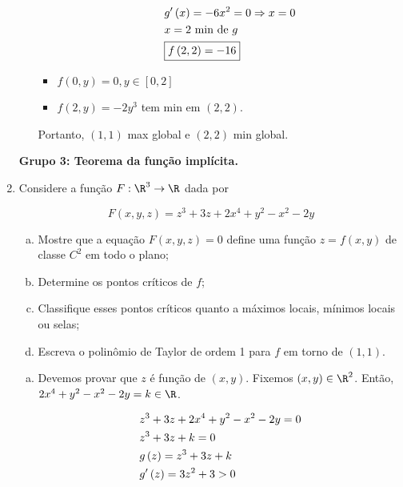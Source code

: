 \documentclass[11pt, oneside, a4paper]{gsm-l}
\begin{document}
\begin{enumerate}
\begin{sol}
\begin{enumerate}[(a)]
\begin{itemize}
\[
\begin{gathered}
  g'\left( x \right) =  - 6x^2  = 0 \Rightarrow x = 0 \hfill \\
  x = 2{\text{ min de }}g \hfill \\
  \boxed{f\left( {2,2} \right) =  - 16} \hfill \\
\end{gathered}
\]

      \item $f(0,y)=0,y \in \left[ {0,2} \right]$
      \item $f(2,y)=-2y^3$ tem min em $(2,2)$.
    \end{itemize}

Portanto, $(1,1)$ max global e $(2,2)$ min global.

  \end{enumerate}
\end{sol}

\newpage 

\textbf{Grupo 3: Teorema da função implícita.}

  \item Considere a função $F:\R^3 \to \R$ dada por

\[
F\left( {x,y,z} \right) = z^3  + 3z + 2x^4  + y^2  - x^2  - 2y
\]


  \begin{enumerate}[(a)]
    \item Mostre que a equação $F(x,y,z)=0$ define uma função $z=f(x,y)$ de classe $C^2$ em todo o plano;
    \item Determine os pontos críticos de $f$;
    \item Classifique esses pontos críticos quanto a máximos locais, mínimos locais ou selas;
    \item Escreva o polin\^omio de Taylor de ordem 1 para $f$ em torno de $(1,1)$.
  \end{enumerate}

\begin{sol}
  \begin{enumerate}[(a)]
    \item Devemos provar que $z$ é função de $(x,y)$. Fixemos $(x,y) \in \R^2$. Então, $2x^4  + y^2  - x^2  - 2y = k \in \R$.

\[
\begin{gathered}
  z^3  + 3z + 2x^4  + y^2  - x^2  - 2y = 0 \hfill \\
  z^3  + 3z + k = 0 \hfill \\
  g\left( z \right) = z^3  + 3z + k \hfill \\
  g'\left( z \right) = 3z^2  + 3 > 0 \hfill \\
\end{gathered}
\]


\end{enumerate}
\end{sol}
\end{enumerate}
\end{document}
